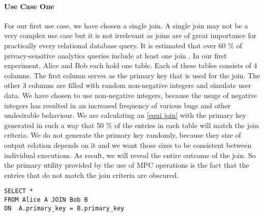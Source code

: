 \paragraph{Use Case One}
For our first use case, we have chosen a single join. A single join may not be a very complex use case but it is not irrelevant as joins are of great importance for practically every relational database query. It is estimated that over 60 \% of privacy-sensitive analytics queries include at least one join \cite{johnson2017practical}. In our first experiment, Alice and Bob each hold one table. Each of these tables consists of 4 columns. The first column serves as the primary key that is used for the join. The other 3 columns are filled with random non-negative integers and simulate user data. We have chosen to use non-negative integers, because the usage of negative integers has resulted in an  increased frequency of various bugs and other undesirable behaviour. We are calculating an \hyperref[Databases]{[equi join]}  with the primary key generated in such a way that 50 \% of the entries in each table will match the join criteria. We do not generate the primary key randomly, because they size of output relation depends on it and we want those sizes to be consistent between individual executions. As result, we will reveal the entire outcome of the join. So the primary utility provided by the use of MPC operations is the fact that the entries that do not match the join criteria are obscured.

\label{SQL1_label}				
\begin{lstlisting}[caption={ Functional equivalent SQL statement for our first use case  }]
SELECT * 
FROM Alice A JOIN Bob B 
ON  A.primary_key = B.primary_key
\end{lstlisting}
\label{SQL1}
	\label{Use Case two}		
